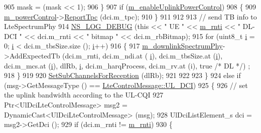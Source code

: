 \begin{DoxyCode}
905               mask = (mask << 1);
906             \}
907           \textcolor{keywordflow}{if} (\hyperlink{classns3_1_1LteUePhy_a894d55731114732593b7d7eef8cb94b2}{m\_enableUplinkPowerControl})
908             \{
909               \hyperlink{classns3_1_1LteUePhy_a60d8441e8e06f624019df3ab9c9c6dec}{m\_powerControl}->\hyperlink{classns3_1_1LteUePowerControl_ad3ede15a24b707741290e6a94e5d82de}{ReportTpc} (dci.m\_tpc);
910             \}
911 
912 
913           \textcolor{comment}{// send TB info to LteSpectrumPhy}
914           \hyperlink{group__logging_ga413f1886406d49f59a6a0a89b77b4d0a}{NS\_LOG\_DEBUG} (\textcolor{keyword}{this} << \textcolor{stringliteral}{" UE "} << \hyperlink{classns3_1_1LteUePhy_a887b5dc4e246a308cd09127b64ed8fac}{m\_rnti} << \textcolor{stringliteral}{" DL-DCI "} << dci.m\_rnti << \textcolor{stringliteral}{" bitmap 
      "}  << dci.m\_rbBitmap);
915           \textcolor{keywordflow}{for} (uint8\_t \hyperlink{bernuolliDistribution_8m_a6f6ccfcf58b31cb6412107d9d5281426}{i} = 0; \hyperlink{bernuolliDistribution_8m_a6f6ccfcf58b31cb6412107d9d5281426}{i} < dci.m\_tbsSize.size (); \hyperlink{bernuolliDistribution_8m_a6f6ccfcf58b31cb6412107d9d5281426}{i}++)
916             \{
917               \hyperlink{classns3_1_1LtePhy_a9d9d4f9b07919b941583dca6f4789762}{m\_downlinkSpectrumPhy}->AddExpectedTb (dci.m\_rnti, dci.m\_ndi.at (
      \hyperlink{bernuolliDistribution_8m_a6f6ccfcf58b31cb6412107d9d5281426}{i}), dci.m\_tbsSize.at (\hyperlink{bernuolliDistribution_8m_a6f6ccfcf58b31cb6412107d9d5281426}{i}), dci.m\_mcs.at (\hyperlink{bernuolliDistribution_8m_a6f6ccfcf58b31cb6412107d9d5281426}{i}), dlRb, \hyperlink{bernuolliDistribution_8m_a6f6ccfcf58b31cb6412107d9d5281426}{i}, dci.m\_harqProcess, dci.m\_rv.at (i), \textcolor{keyword}{true} \textcolor{comment}{/* DL */})
      ;
918             \}
919 
920           \hyperlink{classns3_1_1LteUePhy_abaad47ec4b8f5ea75990a4476261cf81}{SetSubChannelsForReception} (dlRb);
921 
922 
923         \}
924       \textcolor{keywordflow}{else} \textcolor{keywordflow}{if} (msg->GetMessageType () == \hyperlink{classns3_1_1LteControlMessage_a9f9798d5aa8ad40f6432285b4b06135bab9cab20479fe8288477132799afcab91}{LteControlMessage::UL\_DCI})
925         \{
926           \textcolor{comment}{// set the uplink bandwidth according to the UL-CQI}
927           Ptr<UlDciLteControlMessage> msg2 = DynamicCast<UlDciLteControlMessage> (msg);
928           UlDciListElement\_s dci = msg2->GetDci ();
929           \textcolor{keywordflow}{if} (dci.m\_rnti != \hyperlink{classns3_1_1LteUePhy_a887b5dc4e246a308cd09127b64ed8fac}{m\_rnti})
930             \{

\end{DoxyCode}
